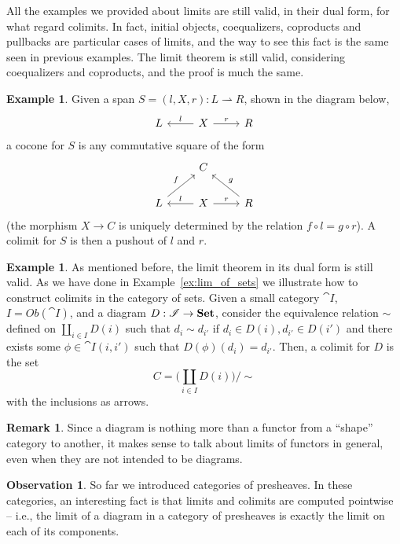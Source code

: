 \documentclass[a4paper, twoside,openright]{report}
\theoremstyle{plain}
\theoremstyle{definition}
\newtheorem{example}[theorem]{Example}
\newtheorem{remark}[theorem]{Remark}
\newtheorem{obs}[theorem]{Observation}
\begin{document}
All the examples we provided about limits are still valid, in their dual form, for what regard colimits. In fact, initial objects, coequalizers, coproducts and pullbacks are particular cases of limits, and the way to see this fact is the same seen in previous examples. The limit theorem is still valid, considering coequalizers and coproducts, and the proof is much the same.

\begin{example}
    Given a span $S = (l, X, r): L \rightharpoonup R$, shown in the diagram below,
    \[
        \begin{tikzcd}
            L & X \arrow[l, "l"swap] \arrow[r, "r"]& R
        \end{tikzcd}
    \]
    a cocone for $S$ is any commutative square of the form
    \[
        \begin{tikzcd}
            & C & \\
            L \arrow[ur, "f"] &
            X \arrow[l, "l"swap] \arrow[r, "r"]&
            R \arrow[ul, "g" swap]
        \end{tikzcd}
    \]
    (the morphism $X \rightarrow C$ is uniquely determined by the relation $f \circ l = g \circ r$).
    A colimit for $S$ is then a pushout of $l$ and $r$.
\end{example}

\begin{example}\label{ex:colm_of_sets}
    As mentioned before, the limit theorem in its dual form is still valid. As we have done in Example~\ref{ex:lim_of_sets} we illustrate how to construct colimits in the category of sets. Given a small category $\cat I$, $ I = Ob(\cat I)$, and a diagram $D: \mathscr{I} \rightarrow \mathbf{Set}$, consider the equivalence relation $\sim$ defined on $\coprod_{i\in I} D(i)$ such that $d_i \sim d_{i'}$ if $d_i \in D(i), d_{i'} \in D(i')$ and there exists some $\phi \in \cat I(i, i')$ such that $D(\phi)(d_i) = d_{i'}$. Then, a colimit for $D$ is the set
    $$
        C = \big ( \coprod_{i \in I} D(i) \big ) / \sim
    $$
    with the inclusions as arrows.
\end{example}

\begin{remark}
    Since a diagram is nothing more than a functor from a ``shape'' category to another, it makes sense to talk about limits of functors in general, even when they are not intended to be diagrams.
\end{remark}

\begin{obs}\label{obs:limits_in_presh}
    So far we introduced categories of presheaves. In these categories, an interesting fact is that limits and colimits are computed pointwise -- i.e., the limit of a diagram in a category of presheaves is exactly the limit on each of its components.
\end{obs}
\end{document}
